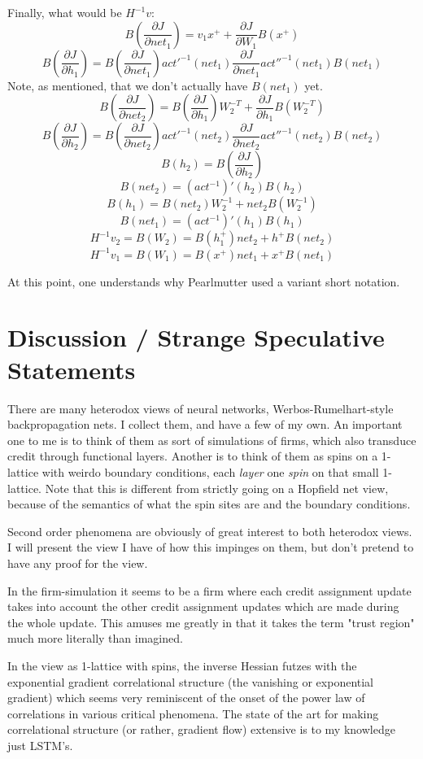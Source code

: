 \documentclass{article}
\begin{document}
Finally, what would be $H^{-1}v$:
$$ B(\frac{\partial J}{\partial net_1}) = v_1 x^+ + \frac{\partial J}{\partial W_1} B(x^+) $$
$$ B(\frac{\partial J}{\partial h_1}) = B(\frac{\partial J}{\partial net_1})act'^{-1}(net_1)
\frac{\partial J}{\partial net_1}act''^{-1}(net_1) B(net_1) $$
Note, as mentioned, that we don't actually have $B(net_1)$ yet.
$$ B(\frac{\partial J}{\partial net_2}) = B(\frac{\partial J}{\partial h_1}) W_2^{-T} + \frac{\partial J}{\partial h_1} B(W_2^{-T})$$
$$ B(\frac{\partial J}{\partial h_2}) = B(\frac{\partial J}{\partial net_2})act'^{-1}(net_2)
\frac{\partial J}{\partial net_2}act''^{-1}(net_2) B(net_2) $$
$$ B(h_2) = B(\frac{\partial J}{\partial h_2})$$
$$ B(net_2) = (act^{-1})'(h_2)B(h_2)$$
$$ B(h_1) = B(net_2) W_2^{-1} + net_2 B(W_2^{-1})$$
$$ B(net_1) = (act^{-1})'(h_1)B(h_1)$$
$$ H^{-1}v_2 = B(W_2) = B(h_1^+) net_2 + h^+ B(net_2)$$
$$ H^{-1}v_1 = B(W_1) = B(x^+) net_1 + x^+ B(net_1)$$

At this point, one understands why Pearlmutter used a variant short notation.

\section{Discussion / Strange Speculative Statements}

There are many heterodox views of neural networks, Werbos-Rumelhart-style backpropagation nets. I collect them, and have a few of my own. An important one to me is to think of them as sort of simulations of firms, which also transduce credit through functional layers. Another is to think of them as spins on a 1-lattice with weirdo boundary conditions, each \textit{layer} one \textit{spin} on that small 1-lattice. Note that this is different from strictly going on a Hopfield net view, because of the semantics of what the spin sites are and the boundary conditions.

Second order phenomena are obviously of great interest to both heterodox views. I will present the view I have of how this impinges on them, but don't pretend to have any proof for the view.

In the firm-simulation it seems to be a firm where each credit assignment update takes into account the other credit assignment updates which are made during the whole update. This amuses me greatly in that it takes the term "trust region" much more literally than imagined.

In the view as 1-lattice with spins, the inverse Hessian futzes with the exponential gradient correlational structure (the vanishing or exponential gradient) which seems very reminiscent of the onset of the power law of correlations in various critical phenomena. The state of the art for making correlational structure (or rather, gradient flow) extensive is to my knowledge just LSTM's\cite{lstm}.
\end{document}
